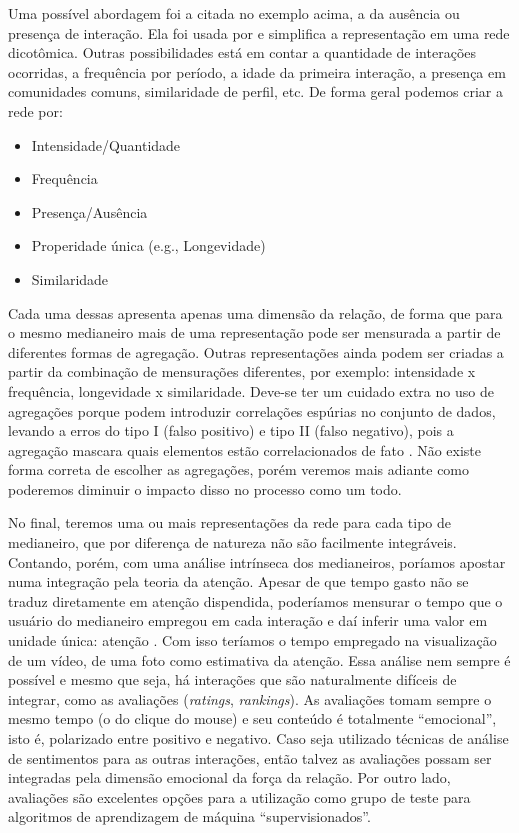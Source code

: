 Uma possível abordagem foi a citada no exemplo acima, a da ausência ou presença
de interação. Ela foi usada por \citet{Xiang2010} e simplifica a representação
em uma rede dicotômica. Outras possibilidades está em contar a quantidade de
interações ocorridas, a frequência por período, a idade da primeira interação, a
presença em comunidades comuns, similaridade de perfil, etc. De forma geral
podemos criar a rede por:

\begin{itemize}
\item Intensidade/Quantidade
\item Frequência
\item Presença/Ausência
\item Properidade única (e.g., Longevidade)
\item Similaridade
\end{itemize}

Cada uma dessas apresenta apenas uma dimensão da relação, de forma que para o
mesmo medianeiro mais de uma representação pode ser mensurada a partir de
diferentes formas de agregação. Outras representações ainda podem ser criadas a
partir da combinação de mensurações diferentes, por exemplo: intensidade x
frequência, longevidade x similaridade. Deve-se ter um cuidado extra no uso de
agregações porque podem introduzir correlações espúrias no conjunto de dados,
levando a erros do tipo I (falso positivo) e tipo II (falso negativo), pois a
agregação mascara quais elementos estão correlacionados de fato
\citep{Jensen2003}. Não existe forma correta de escolher as agregações, porém
veremos mais adiante como poderemos diminuir o impacto disso no processo como um
todo.

No final, teremos uma ou mais representações da rede para cada tipo de
medianeiro, que por diferença de natureza não são facilmente integráveis.
Contando, porém, com uma análise intrínseca dos medianeiros, poríamos apostar
numa integração pela teoria da atenção. Apesar de que tempo gasto não se traduz
diretamente em atenção dispendida, poderíamos mensurar o tempo que o usuário do
medianeiro empregou em cada interação e daí inferir uma valor em unidade única:
atenção \citep{Davenport2001}. Com isso teríamos o tempo empregado na
visualização de um vídeo, de uma foto como estimativa da atenção. Essa análise
nem sempre é possível e mesmo que seja, há interações que são naturalmente
difíceis de integrar, como as avaliações (\emph{ratings}, \emph{rankings}). As
avaliações tomam sempre o mesmo tempo (o do clique do mouse) e seu conteúdo é
totalmente ``emocional'', isto é, polarizado entre positivo e negativo. Caso seja
utilizado técnicas de análise de sentimentos para as outras interações, então
talvez as avaliações possam ser integradas pela dimensão emocional da força da
relação. Por outro lado, avaliações são excelentes opções para a utilização como
grupo de teste para algoritmos de aprendizagem de máquina ``supervisionados''.

